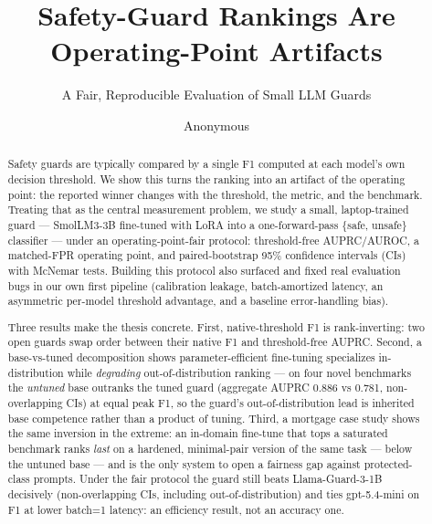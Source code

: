 \documentclass[sigconf,nonacm]{acmart}
\begin{document}
\title{Safety-Guard Rankings Are Operating-Point Artifacts}
\subtitle{A Fair, Reproducible Evaluation of Small LLM Guards}

\author{Anonymous}

\begin{abstract}
Safety guards are typically compared by a single F1 computed at each model's own decision threshold. We show this turns the ranking into an artifact of the operating point: the reported winner changes with the threshold, the metric, and the benchmark. Treating that as the central measurement problem, we study a small, laptop-trained guard --- SmolLM3-3B fine-tuned with LoRA into a one-forward-pass \{safe, unsafe\} classifier --- under an operating-point-fair protocol: threshold-free AUPRC/AUROC, a matched-FPR operating point, and paired-bootstrap 95\% confidence intervals (CIs) with McNemar tests. Building this protocol also surfaced and fixed real evaluation bugs in our own first pipeline (calibration leakage, batch-amortized latency, an asymmetric per-model threshold advantage, and a baseline error-handling bias).

Three results make the thesis concrete. First, native-threshold F1 is rank-inverting: two open guards swap order between their native F1 and threshold-free AUPRC. Second, a base-vs-tuned decomposition shows parameter-efficient fine-tuning specializes in-distribution while \emph{degrading} out-of-distribution ranking --- on four novel benchmarks the \emph{untuned} base outranks the tuned guard (aggregate AUPRC 0.886 vs 0.781, non-overlapping CIs) at equal peak F1, so the guard's out-of-distribution lead is inherited base competence rather than a product of tuning. Third, a mortgage case study shows the same inversion in the extreme: an in-domain fine-tune that tops a saturated benchmark ranks \emph{last} on a hardened, minimal-pair version of the same task --- below the untuned base --- and is the only system to open a fairness gap against protected-class prompts. Under the fair protocol the guard still beats Llama-Guard-3-1B decisively (non-overlapping CIs, including out-of-distribution) and ties gpt-5.4-mini on F1 at lower batch=1 latency: an efficiency result, not an accuracy one.
\end{abstract}

\maketitle
\end{document}
